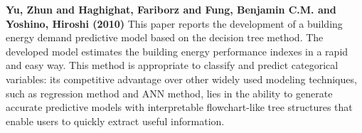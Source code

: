 \textbf{Yu, Zhun and Haghighat, Fariborz and Fung, Benjamin C.M. and Yoshino, Hiroshi (2010)} \cite{yu2010zhun} This paper reports the development of a building energy demand predictive model based on the decision tree method. The developed model estimates the building energy performance indexes in a rapid and easy way. This method is appropriate to classify and predict categorical variables: its competitive advantage over other widely used modeling techniques, such as regression method and ANN method, lies in the ability to generate accurate predictive models with interpretable flowchart-like tree structures that enable users to quickly extract useful information.
